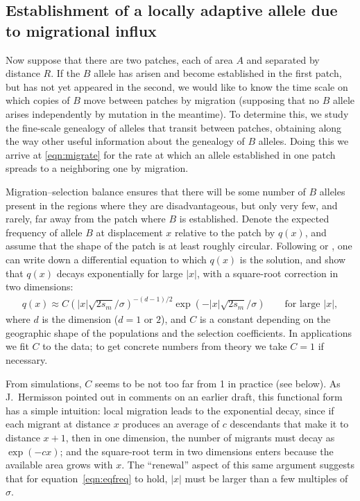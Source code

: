 \documentclass{article}
\newcommand{\linelabel}[1]{}
\newcommand{\citet}[1]{\cite{#1}}
\begin{document}
\subsection[Establishment by Migration]{Establishment of a locally adaptive allele due to migrational influx}
\label{ss:patchymigration}

Now suppose that there are two patches, each of area $A$ and separated by distance $R$. 
If the $B$ allele has arisen and become established in the first patch, but has not yet appeared in the second,
we would like to know the time scale on which copies of $B$ move between patches by migration
(supposing that no $B$ allele arises independently by mutation in the meantime).
To determine this, 
we study the fine-scale genealogy of alleles that transit between patches,
obtaining along the way other useful information about the genealogy of $B$ alleles. 
Doing this we arrive at \eqref{eqn:migrate} for the rate at which 
an allele established in one patch spreads to a neighboring one by migration.

Migration--selection balance ensures that 
there will be some number of $B$ alleles present in the regions where they are disadvantageous,
but only very few, and rarely, far away from the patch where $B$ is established.
Denote the expected frequency of allele $B$ at displacement $x$ relative to the patch by $q(x)$,
and assume that the shape of the patch is at least roughly circular.
Following \citet{haldane1948theory} or \citet{slatkin1973geneflow}, one can write down a differential equation to which $q(x)$ is the solution,
and show that $q(x)$ decays exponentially for large $|x|$,
with a square-root correction in two dimensions:
\begin{align} \label{eqn:eqfreq}
  q(x) \approx C \left( |x| \sqrt{2 s_m}/\sigma \right)^{-(d-1)/2} \exp( - |x| \sqrt{2 s_m} / \sigma) \qquad \text{for large $|x|$},
\end{align}
where $d$ is the dimension ($d=1$ or $2$), 
and $C$ is a constant depending on the geographic shape of the populations and the selection coefficients.
In applications we fit $C$ to the data;
to get concrete numbers from theory we take $C=1$ if necessary.

From simulations, $C$ seems to be not too far from 1 in practice (see below).
As J.\ Hermisson pointed out in comments on an earlier draft,
this functional form has a simple intuition:
local migration leads to the exponential decay,
since if each migrant at distance $x$ 
produces an average of $c$ descendants that make it to distance $x+1$, 
then in one dimension, the number of migrants must decay as $\exp(-cx)$;
and the square-root term in two dimensions 
enters because the available area grows with $x$.  
The ``renewal'' aspect of this same argument suggests that for equation~\eqref{eqn:eqfreq} to hold,
$|x|$ must be larger than a few multiples of $\sigma$.
\linelabel{rr:q_form}
\end{document}
